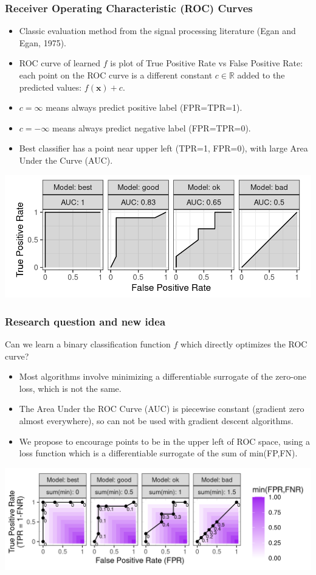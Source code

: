 \documentclass[t]{beamer}
\begin{document}
\begin{frame}
  \frametitle{Receiver Operating Characteristic (ROC) Curves}
  \begin{itemize}
  \item Classic evaluation method from the signal processing
    literature (Egan and Egan, 1975).
  \item ROC curve of learned $f$ is plot of True
    Positive Rate vs False Positive Rate: each point on the ROC curve
    is a different constant $c\in\mathbb R$ added to the predicted
    values: $f(\mathbf x)+c$.
  \item $c=\infty$ means always predict positive label (FPR=TPR=1).
  \item $c=-\infty$ means always predict negative label (FPR=TPR=0).
  \item Best classifier has a point near upper left (TPR=1, FPR=0), with large
    Area Under the Curve (AUC).
  \end{itemize}
  \includegraphics[width=\textwidth]{figure-more-than-one-binary}
\end{frame}

\begin{frame}
  \frametitle{Research question and new idea}
  Can we learn a binary classification function $f$ which directly
  optimizes the ROC curve?
  \begin{itemize}
  \item Most algorithms involve minimizing a differentiable surrogate
    of the zero-one loss, which is not the same.
  \item The Area Under the ROC Curve (AUC) is piecewise constant
    (gradient zero almost everywhere), so can not be used with
    gradient descent algorithms.
  \item We propose to encourage points to be in the upper left of ROC
    space, using a loss function which is a differentiable surrogate
    of the sum of min(FP,FN).
  \end{itemize}
  \includegraphics[width=\textwidth]{figure-more-than-one-binary-heat}
\end{frame}
 
\end{document}
